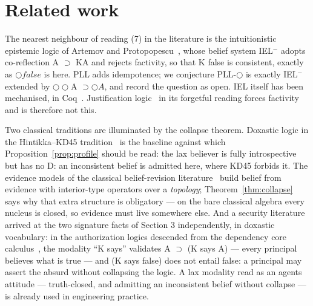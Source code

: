 \section{Related work}\label{8-related-work}

The nearest neighbour of reading (7) in the literature is the
intuitionistic epistemic logic of Artemov and Protopopescu~\cite{ArtemovProtopopescu2016}, whose
belief system IEL\ensuremath{{}^{-}} adopts co-reflection A \ensuremath{\supset} KA and rejects factivity,
so that K false is consistent, exactly as \ensuremath{\bigcirc\mathit{false}} is here. PLL
adds idempotence; we conjecture PLL-\ensuremath{\bigcirc} is exactly IEL\ensuremath{{}^{-}} extended by
\ensuremath{\bigcirc\bigcirc}A \ensuremath{\supset \bigcirc A}, and record the question as open. IEL itself has
been mechanised, in Coq~\cite{HagemeierKirst2022}. Justification
logic~\cite{Artemov2001,Artemov2008,ArtemovFitting2019} in its
forgetful reading forces factivity and is therefore not this.

Two classical traditions are illuminated by the collapse theorem.
Doxastic logic in the Hintikka--KD45
tradition~\cite{Hintikka1962,FaginHalpernMosesVardi1995,Stalnaker2006}
is the
baseline against which Proposition~\ref{prop:profile} should be read:
the lax believer is fully introspective but has no D: an
inconsistent belief is admitted here, where KD45 forbids it. The evidence
models of the classical belief-revision
literature~\cite{VanBenthemPacuit2011,BaltagBezhanishviliOzgunSmets2016,
BaltagBezhanishviliOzgunSmets2022}
build belief from evidence with interior-type operators over a
\emph{topology}; Theorem~\ref{thm:collapse} says why that extra
structure is obligatory --- on the bare classical algebra every nucleus
is closed, so evidence must live somewhere else. And a security
literature arrived at the two signature facts of Section 3
independently, in doxastic vocabulary: in the authorization logics
descended from the dependency core
calculus~\cite{Abadi2006,GargAbadi2008}, the modality ``K says''
validates A \ensuremath{\supset} (K says A) --- every principal believes what is
true --- and (K says false) does not entail false: a principal may
assert the absurd without collapsing the logic. A lax modality read as
an agent\textquotesingle s attitude --- truth-closed, and admitting an inconsistent
belief without collapse --- is already used in engineering practice.

